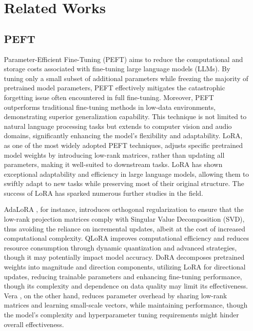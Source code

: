 \section{Related Works}
\subsection{PEFT}
Parameter-Efficient Fine-Tuning (PEFT) \cite{houlsby2019parameterefficienttransferlearningnlp} aims to reduce the computational and storage costs associated with fine-tuning large language models (LLMs). By tuning only a small subset of additional parameters while freezing the majority of pretrained model parameters, PEFT effectively mitigates the catastrophic forgetting issue often encountered in full fine-tuning. Moreover, PEFT outperforms traditional fine-tuning methods in low-data environments, demonstrating superior generalization capability. This technique is not limited to natural language processing tasks but extends to computer vision and audio domains, significantly enhancing the model's flexibility and adaptability. LoRA, as one of the most widely adopted PEFT techniques, adjusts specific pretrained model weights by introducing low-rank matrices, rather than updating all parameters, making it well-suited to downstream tasks. LoRA has shown exceptional adaptability and efficiency in large language models, allowing them to swiftly adapt to new tasks while preserving most of their original structure. The success of LoRA has sparked numerous further studies in the field.

AdaLoRA \cite{zhang2023adaloraadaptivebudgetallocation}, for instance, introduces orthogonal regularization to ensure that the low-rank projection matrices comply with Singular Value Decomposition (SVD), thus avoiding the reliance on incremental updates, albeit at the cost of increased computational complexity. QLoRA \cite{dettmers2023qloraefficientfinetuningquantized} improves computational efficiency and reduces resource consumption through dynamic quantization and advanced strategies, though it may potentially impact model accuracy. DoRA \cite{liu2024dora} decomposes pretrained weights into magnitude and direction components, utilizing LoRA for directional updates, reducing trainable parameters and enhancing fine-tuning performance, though its complexity and dependence on data quality may limit its effectiveness. Vera \cite{kopiczko2024veravectorbasedrandommatrix}, on the other hand, reduces parameter overhead by sharing low-rank matrices and learning small-scale vectors, while maintaining performance, though the model's complexity and hyperparameter tuning requirements might hinder overall effectiveness.

